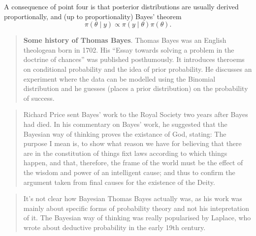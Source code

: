 \documentclass[
]{book}
\theoremstyle{definition}
\theoremstyle{definition}
\theoremstyle{definition}
\theoremstyle{definition}
\theoremstyle{remark}
\begin{document}
A consequence of point four is that posterior distributions are usually derived proportionally, and (up to proportionality) Bayes' theorem
\[
\pi(\theta \mid y) \propto \pi(y\mid\theta)\pi(\theta).
\]

\begin{quote}
\textbf{Some history of Thomas Bayes}. Thomas Bayes was an English theologean born in 1702. His ``Essay towards solving a problem in the doctrine of chances'' was published posthumously. It introduces theroems on conditional probability and the idea of prior probability. He discusses an experiment where the data can be modelled using the Binomial distribution and he guesses (places a prior distribution) on the probability of success.
\end{quote}

\begin{quote}
Richard Price sent Bayes' work to the Royal Society two years after Bayes had died. In his commentary on Bayes' work, he suggested that the Bayesian way of thinking proves the existance of God, stating: The purpose I mean is, to show what reason we have for believing that there are in the constitution of things fixt laws according to which things happen, and that, therefore, the frame of the world must be the effect of the wisdom and power of an intelligent cause; and thus to confirm the argument taken from final causes for the existence of the Deity.
\end{quote}

\begin{quote}
It's not clear how Bayesian Thomas Bayes actually was, as his work was mainly about specific forms of probability theory and not his intepretation of it. The Bayesian way of thinking was really popularised by Laplace, who wrote about deductive probability in the early 19th century.
\end{quote}
\end{document}
